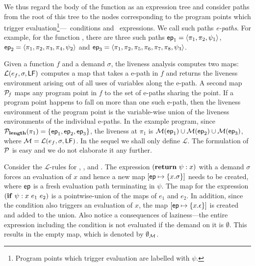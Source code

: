 \documentclass[9pt]{sigplanconf}
\begin{document}
We thus  regard the  body of  the function as  an expression  tree and
consider paths from  the root of this tree to  the nodes corresponding
to the program points which trigger evaluation\footnote{Program points
  which      trigger      evaluation       are      labelled      with
  $\psi$.}---\SIF\ conditions and \SRETURN\ expressions.  We call such
paths {\em e-paths}.  For example, for the function \length, there are
three  such paths  $\mathsf{ep}_1 =  \langle \pi_1,  \pi_2, \psi_1\rangle$,
$\mathsf{ep}_2  = \langle\pi_1,  \pi_2,  \pi_3,  \pi_4, \psi_2\rangle$  and
$\mathsf{ep}_3  =  \langle  \pi_1,   \pi_2,  \pi_5,  \pi_6,  \pi_7,  \pi_8,
\psi_3\rangle$.

Given  a function  $\mathit{f}$ and  a demand  $\sigma$,  the liveness
analysis  computes  two   maps:  $\mathcal{L}(e_f,  \sigma,  \mathsf{LF})$
computes a  map that takes a  e-path in ${\mathit f}$  and returns the
liveness environment  arising out of  all uses of variables  along the
e-path.  A second map $\cal{P}_{\mathit  f}$ maps any program point in
$\mathit f$  to the set  of e-paths sharing  the point.  If  a program
point happens to fall on more  than one such e-path, then the liveness
environment of  the program  point is the  variable-wise union  of the
liveness  environments  of the  individual  e-paths.   In the  example
program,  since ${\mathcal P}_{\mathbf{length}}(\pi_1)  = \lbrace  \mathsf{ep}_1, \mathsf{ep}_2,
\mathsf{ep}_3\rbrace$, the  liveness at $\pi_1$  is ${\cal M}(\mathsf{ep}_1)  \cup {\cal
  M}(\mathsf{ep}_2) \cup  {\cal M}(\mathsf{ep}_3)$,  where ${\cal M}  = \mathcal{L}(e_f,
\sigma, \mathsf{LF})$.  In the  sequel we shall only define $\mathcal{L}$.
The formulation  of $\cal{P}$ is easy  and we do not  elaborate it any
further.

Consider the  $\mathcal{L}$-rules for {\LET}, {\SIF},  and {\SRETURN}.
The expression  $(\mbox{$\mathbf{ return}$}~\psi:x)$ with  a demand $\sigma$  forces an
evaluation  of  $x$ and  hence  a  new map  $[\mathit{\mathsf{ep}}  \mapsto
  \{x.\sigma\}]  $ needs  to be  created,  where $\mathsf{ep}$  is a  fresh
evaluation path  terminating in  $\psi$.  The  map for  the expression
$(\mbox{$\mathbf{ if}$}~\psi:x~e_1~e_2)$ is a pointwise-union of  the maps of $e_1$ and
$e_2$. In addition, since the condition also triggers an evaluation of
$x$, the map $[\mathit{\mathsf{ep}} \mapsto \{x.\epsilon\}]$ is created and
added  to the  union.  Also  notice a  consequences of  laziness---the
entire  expression including  the condition  is not  evaluated if  the
demand on it is $\emptyset$.  This  results in the empty map, which is
denoted by $\emptyset_{\cal{M}}$.
\end{document}
